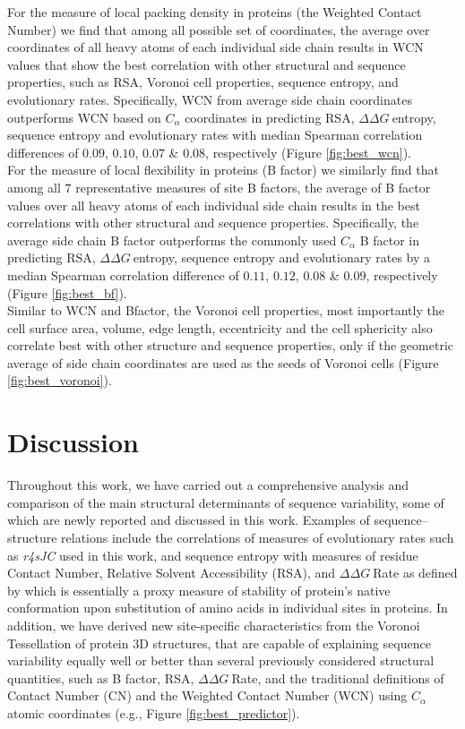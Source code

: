 \documentclass[11pt]{article}
\newcommand{\ddg}{$\Delta\Delta G~$}
\begin{document}
        For the measure of local packing density in proteins (the Weighted Contact Number) we find that among all possible set of coordinates, the average over coordinates of all heavy atoms of each individual side chain results in WCN values that show the best correlation with other structural and sequence properties, such as RSA, Voronoi cell properties, sequence entropy, and evolutionary rates. Specifically, WCN from average side chain coordinates outperforms WCN based on $C_\alpha$ coordinates in predicting RSA, \ddg entropy, sequence entropy and evolutionary rates with median Spearman correlation differences of $0.09$, $0.10$, $0.07$ \& $0.08$, respectively (Figure \ref{fig:best_wcn}).
        \\

        For the measure of local flexibility in proteins (B factor) we similarly find that among all $7$ representative measures of site B factors, the average of B factor values over all heavy atoms of each individual side chain results in the best correlations with other structural and sequence properties. Specifically, the average side chain B factor outperforms the commonly used $C_\alpha$ B factor in predicting RSA, \ddg entropy, sequence entropy and evolutionary rates by a median Spearman correlation difference of $0.11$, $0.12$, $0.08$ \& $0.09$, respectively (Figure \ref{fig:best_bf}).
        \\

        Similar to WCN and Bfactor, the Voronoi cell properties, most importantly the cell surface area, volume, edge length, eccentricity and the cell sphericity also correlate best with other structure and sequence properties, only if the geometric average of side chain coordinates are used as the seeds of Voronoi cells (Figure \ref{fig:best_voronoi}).
        \\

\section{Discussion}
\label{sec:dcr}

        Throughout this work, we have carried out a comprehensive analysis and comparison of the main structural determinants of sequence variability, some of which are newly reported and discussed in this work. Examples of sequence--structure relations include the correlations of measures of evolutionary rates such as {\it r4sJC} used in this work, and sequence entropy with measures of residue Contact Number, Relative Solvent Accessibility (RSA), and \ddg Rate as defined by \citet{echave_relationship_2014} which is essentially a proxy measure of stability of protein's native conformation upon substitution of amino acids in individual sites in proteins. In addition, we have derived new site-specific characteristics from the Voronoi Tessellation of protein 3D structures, that are capable of explaining sequence variability equally well or better than several previously considered structural quantities, such as B factor, RSA, \ddg Rate, and the traditional definitions of Contact Number (CN) and the Weighted Contact Number (WCN) using $C_\alpha$ atomic coordinates (e.g., Figure \ref{fig:best_predictor}). \\
\end{document}

